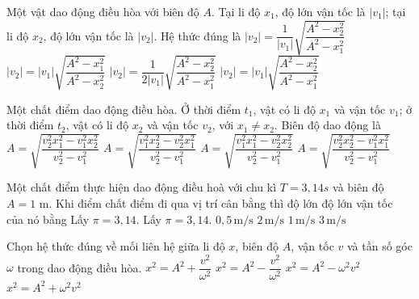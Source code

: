 \begin{ex}
	Một vật dao động điều hòa với biên độ $A$. Tại li độ $x_1$, độ lớn vận tốc là $|v_1|$; tại li độ $x_2$, độ lớn vận tốc là $|v_2|$. Hệ thức đúng là
	\choice
	{$|v_2|=\dfrac{1}{|v_1|}\sqrt{\dfrac{A^2-x_2^2}{A^2-x_1^2}}$}
	{$|v_2|=|v_1|\sqrt{\dfrac{A^2-x_1^2}{A^2-x_2^2}}$}
	{$|v_2|=\dfrac{1}{2|v_1|}\sqrt{\dfrac{A^2-x_2^2}{A^2-x_1^2}}$}
	{\True $|v_2|=|v_1|\sqrt{\dfrac{A^2-x_2^2}{A^2-x_1^2}}$}
\end{ex}

\begin{ex}
	Một chất điểm dao động điều hòa. Ở thời điểm $t_1$, vật có li độ $x_1$ và vận tốc $v_1$; ở thời điểm $t_2$, vật có li độ $x_2$ và vận tốc $v_2$, với $x_1\ne x_2$. Biên độ dao động là
	\choice
	{\True $A=\sqrt{\dfrac{v_2^2x_1^2-v_1^2x_2^2}{v_2^2-v_1^2}}$}
	{$A=\sqrt{\dfrac{v_1^2x_2^2-v_2^2x_1^2}{v_2^2-v_1^2}}$}
	{$A=\sqrt{\dfrac{v_1^2x_1^2-v_2^2x_2^2}{v_2^2-v_1^2}}$}
	{$A=\sqrt{\dfrac{v_2^2x_2^2-v_1^2x_1^2}{v_2^2-v_1^2}}$}
\end{ex}

\begin{ex}
	Một chất điểm thực hiện dao động điều hoà với chu kì $T=3{,}14s$ và biên độ $A=1$ m. Khi điểm chất điểm đi qua vị trí cân bằng thì độ lớn độ lớn vận tốc của nó bằng Lấy $\pi=3,14$. Lấy $\pi=3,14$.
	\choice
	{$0,5\,\mathrm{m/s}$}
	{\True $2\,\mathrm{m/s}$}
	{$1\,\mathrm{m/s}$}
	{$3\,\mathrm{m/s}$}
\end{ex}

\begin{ex}
	Chọn hệ thức đúng về mối liên hệ giữa li độ $x$, biên độ $A$, vận tốc $v$ và tần số góc $\omega$ trong dao động điều hòa.
	\choice
	{$x^2=A^2+\dfrac{v^2}{\omega^2}$}
	{\True $x^2=A^2-\dfrac{v^2}{\omega^2}$}
	{$x^2=A^2-\omega^2v^2$}
	{$x^2=A^2+\omega^2v^2$}
\end{ex}

